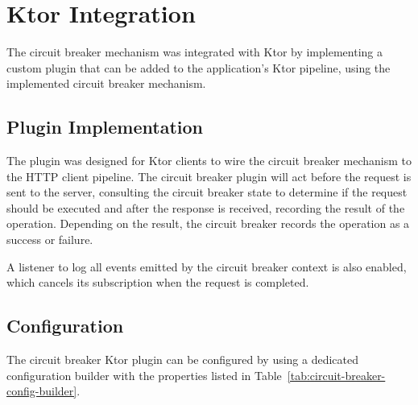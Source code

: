 \resilienceMechanismDefaultConfig


\section{Ktor Integration}\label{sec:cbreaker-ktor-integration}

The circuit breaker mechanism was integrated with Ktor by implementing a custom plugin that can be added to the application's Ktor pipeline, using the implemented circuit breaker mechanism.

\subsection{Plugin Implementation}\label{subsec:cbreaker-plugin}

The plugin was designed for Ktor clients to wire the circuit breaker mechanism to the HTTP client pipeline.
The circuit breaker plugin will act before the request is sent to the server,
consulting the circuit breaker state to determine if the request should be executed and after the response is received,
recording the result of the operation.
Depending on the result, the circuit breaker records the operation as a success or failure.

A listener to log all events emitted by the circuit breaker context is also enabled, which cancels its subscription
when the request is completed.

\subsection{Configuration}\label{subsec:cbreaker-configuration}

The circuit breaker Ktor plugin can be configured
by using a dedicated configuration builder with the properties listed in Table~\ref{tab:circuit-breaker-config-builder}.


